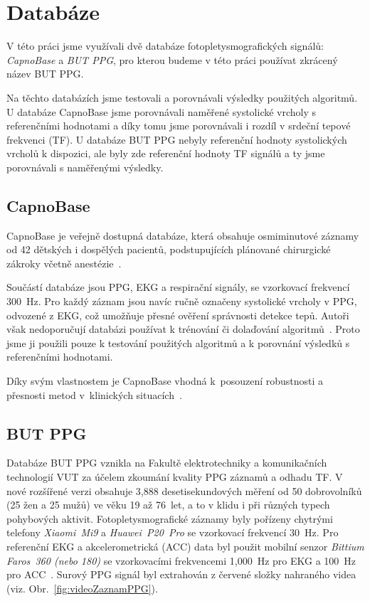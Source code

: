 \raggedbottom
\chapter{Databáze}
\label{chap:databaze}

V této práci jsme využívali dvě databáze fotopletysmografických signálů: \textit{CapnoBase} a \textit{\acl{BUT PPG}}, pro kterou budeme v této práci používat zkrácený název \acs{BUT PPG}.

Na těchto databázích jsme testovali a porovnávali výsledky použitých algoritmů.
U databáze CapnoBase jsme porovnávali naměřené systolické vrcholy s referenčními hodnotami a díky tomu jsme porovnávali i rozdíl v srdeční tepové frekvenci (\acs{TF}).
U databáze \acs{BUT PPG} nebyly referenční hodnoty systolických vrcholů k dispozici, ale byly zde referenční hodnoty \acs{TF} signálů a ty jsme porovnávali s naměřenými výsledky.

\section{CapnoBase}
\label{sec:capnobase}

CapnoBase je veřejně dostupná databáze, která obsahuje osmiminutové záznamy od 42 dětských i dospělých pacientů, podstupujících plánované chirurgické zákroky včetně anestézie~\cite{CapnoBase}.

Součástí databáze jsou \acs{PPG}, \acs{EKG} a respirační signály, se vzorkovací frekvencí 300~Hz.
Pro každý záznam jsou navíc ručně označeny systolické vrcholy v \acs{PPG}, odvozené z \acs{EKG}, což umožňuje přesné ověření správnosti detekce tepů.
Autoři však nedoporučují databázi používat k trénování či dolaďování algoritmů~\cite{CapnoBase}.
Proto jsme ji použili pouze k testování použitých algoritmů a k porovnání výsledků s referenčními hodnotami.

Díky svým vlastnostem je CapnoBase vhodná k~posouzení robustnosti a přesnosti metod v~klinických situacích~\cite{Karlen2013, Charlton2022}.

\section{\acs{BUT PPG}}
\label{sec:but_ppg}

Databáze \acs{BUT PPG} vznikla na Fakultě elektrotechniky a komunikačních technologií \acs{VUT} za účelem zkoumání kvality \acs{PPG} záznamů a odhadu \acs{TF}.
V nové rozšířené verzi obsahuje 3,888 desetisekundových měření od 50 dobrovolníků (25 žen a 25 mužů) ve věku 19 až 76~let, a to v klidu i při různých typech pohybových aktivit.
Fotopletysmografické záznamy byly pořízeny chytrými telefony \textit{Xiaomi~Mi9} a \textit{Huawei~P20~Pro} se vzorkovací frekvencí 30~Hz.
Pro referenční \acs{EKG} a akcelerometrická (\acs{ACC}) data byl použit mobilní senzor \textit{Bittium Faros~360 (nebo 180)} se vzorkovacími frekvencemi 1,000~Hz pro \acs{EKG} a 100~Hz pro \acs{ACC}~\cite{BUT_PPG,BUT_PPG_database}.
Surový \acs{PPG} signál byl extrahován z červené složky nahraného videa (viz. Obr.~\ref{fig:videoZaznamPPG}).

